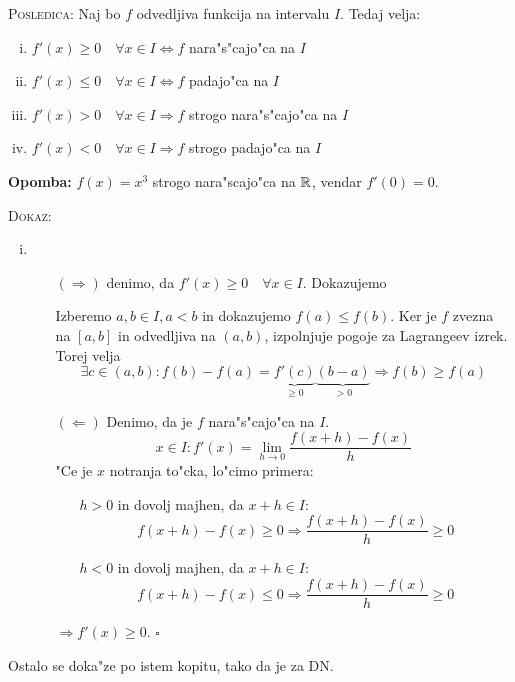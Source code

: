\textsc{Posledica:} Naj bo $f$ odvedljiva funkcija na intervalu $I$. Tedaj velja:
\begin{enumerate}[(i)]
	\item $f'(x) \geq 0 \quad \forall x \in I \iff f$ nara"s"cajo"ca na $I$
	\item $f'(x) \leq 0 \quad \forall x \in I \iff f$ padajo"ca na $I$
	\item $f'(x) > 0 \quad \forall x \in I \Rightarrow f$ strogo nara"s"cajo"ca na $I$
	\item $f'(x) < 0 \quad \forall x \in I \Rightarrow f$ strogo padajo"ca na $I$
\end{enumerate}
\textbf{Opomba:} $f(x) = x^3$ strogo nara"scajo"ca na $\mathbb{R}$, vendar $f'(0) = 0$.

\textsc{Dokaz:}
\begin{enumerate}[(i)]
\item
\begin{itemize}
	\item[$(\Rightarrow)$] denimo, da $f'(x) \geq 0 \quad \forall x \in I$. Dokazujemo 
	
	Izberemo $a, b \in I, a < b$ in dokazujemo $f(a) \leq f(b)$. Ker je $f$ zvezna na $[a, b]$ in odvedljiva na $(a, b)$, izpolnjuje pogoje za Lagrangeev izrek. Torej velja
	\begin{equation*}
	\exists c \in (a, b): f(b) - f(a) = \underbrace{f'(c)}_{\geq 0} \underbrace{(b - a)}_{> 0} \Rightarrow f(b) \geq f(a)
	\end{equation*}
	
	\item[$(\Leftarrow)$] Denimo, da je $f$ nara"s"cajo"ca na $I$.
	\begin{equation*}
	x \in I: f'(x) = \lim_{h \to 0} \dfrac{f(x+h) - f(x)}{h}
	\end{equation*}
	"Ce je $x$ notranja to"cka, lo"cimo primera:
	\begin{itemize}
		\item[$h>0$] in dovolj majhen, da $x + h \in I$:
		\begin{equation*}
		f(x+h) - f(x) \geq 0 \Rightarrow \dfrac{f(x+h) - f(x)}{h} \geq 0
		\end{equation*}
		
		\item[$h < 0$] in dovolj majhen, da $x + h \in I$:
		\begin{equation*}
		f(x+h) - f(x) \leq 0 \Rightarrow\dfrac{f(x+h) - f(x)}{h} \geq 0
		\end{equation*}
	\end{itemize}
	$\Rightarrow f'(x) \geq 0$.
	\hfill $\square$
\end{itemize}
\end{enumerate}
Ostalo se doka"ze po istem kopitu, tako da je za DN.

